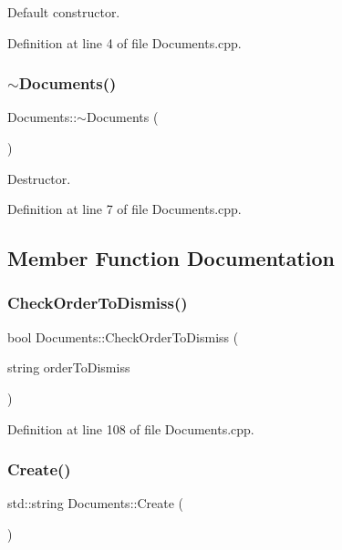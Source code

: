 Default constructor. 



Definition at line 4 of file Documents.\+cpp.

\mbox{\label{class_documents_a67e92e6e30aeff0300ac69e55bd2aab0}} 
\subsubsection{\texorpdfstring{$\sim$\+Documents()}{~Documents()}}
{\footnotesize\ttfamily Documents\+::$\sim$\+Documents (\begin{DoxyParamCaption}{ }\end{DoxyParamCaption})}



Destructor. 



Definition at line 7 of file Documents.\+cpp.



\subsection{Member Function Documentation}
\mbox{\label{class_documents_a97d69eea71291c43d6c344c4efeb8fc6}} 
\subsubsection{\texorpdfstring{Check\+Order\+To\+Dismiss()}{CheckOrderToDismiss()}}
{\footnotesize\ttfamily bool Documents\+::\+Check\+Order\+To\+Dismiss (\begin{DoxyParamCaption}\item[{string}]{order\+To\+Dismiss }\end{DoxyParamCaption})}



Definition at line 108 of file Documents.\+cpp.

\mbox{\label{class_documents_a524740a8fbe3933562d63c9999c0cb53}} 
\subsubsection{\texorpdfstring{Create()}{Create()}}
{\footnotesize\ttfamily std\+::string Documents\+::\+Create (\begin{DoxyParamCaption}{ }\end{DoxyParamCaption})}



